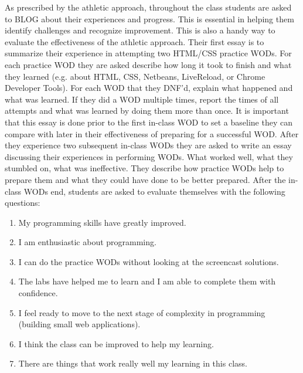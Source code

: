 As prescribed by the athletic approach, throughout the class students are asked to BLOG about their experiences and progress. This is essential in helping them identify  challenges and recognize improvement. This is also a handy way to evaluate the effectiveness of the athletic approach. Their first essay is to summarize their experience in attempting two HTML/CSS practice WODs. For each practice WOD they are asked describe how long it took to finish and what they learned (e.g. about HTML, CSS, Netbeans, LiveReload, or Chrome Developer Tools). For each WOD that they DNF'd, explain what happened and what was learned. If they did a WOD multiple times, report the times of all attempts and what was learned by doing them more than once. It is important that this essay is done prior to the first in-class WOD to set a baseline they can compare with later in their effectiveness of preparing for a successful WOD. After they experience two subsequent in-class WODs they are asked to write an essay discussing their experiences in performing WODs. What worked well, what they stumbled on, what was ineffective. They describe how practice WODs help to prepare them and what they could have done to be better prepared. After the in-class WODs end, students are asked to evaluate themselves with the following questions:
\begin{enumerate}
\item My programming skills have greatly improved.
\item I am enthusiastic about programming.
\item I can do the practice WODs without looking at the screencast solutions.
\item The labs have helped me to learn and I am able to complete them with confidence.
\item I feel ready to move to the next stage of complexity in programming (building small web applications).
\item I think the class can be improved to help my learning.
\item There are things that work really well my learning in this class.
\end{enumerate}
    
